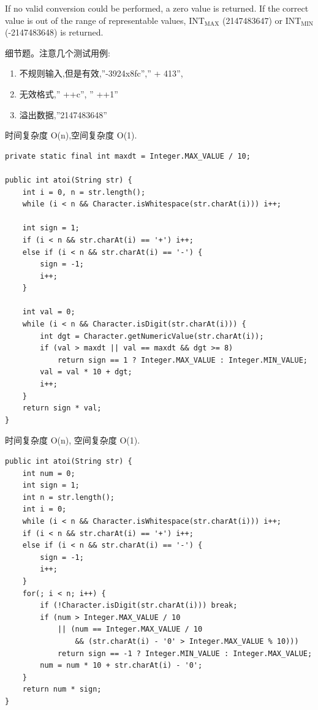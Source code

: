 \documentclass[12pt]{book}
\begin{document}
If no valid conversion could be performed, a zero value is
returned. If the correct value is out of the range of representable
values, INT$_{\text{MAX}}$ (2147483647) or INT$_{\text{MIN}}$ (-2147483648) is returned.

细节题。注意几个测试用例:

\begin{enumerate}
\item 不规则输入,但是有效,”-3924x8fc”,” + 413”,

\item 无效格式,” ++c”, ” ++1”

\item 溢出数据,”2147483648”
\end{enumerate}

时间复杂度 O(n),空间复杂度 O(1). 
\lstset{language=java,label= ,caption= ,numbers=none}
\begin{lstlisting}
private static final int maxdt = Integer.MAX_VALUE / 10;

public int atoi(String str) {
    int i = 0, n = str.length();
    while (i < n && Character.isWhitespace(str.charAt(i))) i++;

    int sign = 1;
    if (i < n && str.charAt(i) == '+') i++;
    else if (i < n && str.charAt(i) == '-') {
        sign = -1;
        i++;
    }

    int val = 0;
    while (i < n && Character.isDigit(str.charAt(i))) {
        int dgt = Character.getNumericValue(str.charAt(i));
        if (val > maxdt || val == maxdt && dgt >= 8) 
            return sign == 1 ? Integer.MAX_VALUE : Integer.MIN_VALUE;
        val = val * 10 + dgt;
        i++;
    }
    return sign * val;
}
\end{lstlisting}

时间复杂度 O(n), 空间复杂度 O(1). 

\lstset{language=java,label= ,caption= ,numbers=none}
\begin{lstlisting}
public int atoi(String str) {
    int num = 0;
    int sign = 1;
    int n = str.length();
    int i = 0;
    while (i < n && Character.isWhitespace(str.charAt(i))) i++;
    if (i < n && str.charAt(i) == '+') i++;
    else if (i < n && str.charAt(i) == '-') {
        sign = -1;
        i++;
    }
    for(; i < n; i++) {
        if (!Character.isDigit(str.charAt(i))) break;
        if (num > Integer.MAX_VALUE / 10
            || (num == Integer.MAX_VALUE / 10            
                && (str.charAt(i) - '0' > Integer.MAX_VALUE % 10)))
            return sign == -1 ? Integer.MIN_VALUE : Integer.MAX_VALUE;
        num = num * 10 + str.charAt(i) - '0';
    }
    return num * sign;
}
\end{lstlisting}
\end{document}
